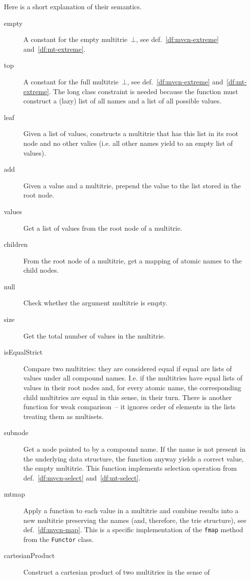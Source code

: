 \documentclass{article}
\theoremstyle{definition}
\begin{document}
Here is a short explanation of their semantics.
\begin{description}
\item [empty]
  A constant for the empty multitrie~$\bot$, see def.~\ref{df:mvcn-extreme}
  and~\ref{df:mt-extreme}.
\item [top]
  A constant for the full multitrie~$\bot$, see def.~\ref{df:mvcn-extreme}
  and~\ref{df:mt-extreme}.  The long class constraint is needed because the
  function must construct a (lazy) list of all names and a list of all possible
  values.
\item [leaf] Given a list of values, constructs a multitrie that has this list
  in its root node and no other valies (i.e. all other names yield to an empty
  list of values).
\item [add]
  Given a value and a multitrie, prepend the value to the list stored in the
  root node.
\item [values]
  Get a list of values from the root node of a multitrie.
\item [children]
  From the root node of a multitrie, get a mapping of atomic names to the
  child nodes.
\item [null]
  Check whether the argument multitrie is empty.
\item [size]
  Get the total number of values in the multitrie.
\item [isEqualStrict]
  Compare two multitries: they are considered equal if equal are lists of
  values under all compound names. I.e. if the multitries have equal lists
  of values in their root nodes and, for every atomic name, the corresponding
  child multitries are equal in this sense, in their turn. There is another
  function for weak comparison~-- it ignores order of elements in the lists
  treating them as multisets.
\item [subnode]
  Get a node pointed to by a compound name. If the name is not present in the
  underlying data structure, the function anyway yields a correct value, the
  empty multitrie. This function implements selection operation from
  def.~\ref{df:mvcn-select} and~\ref{df:mt-select}.
\item [mtmap]
  Apply a function to each value in a multitrie and combine results into
  a new multitrie preserving the names (and, therefore, the trie structure),
  see def.~\ref{df:mvcn-map}.
  This is a specific implementation of the \lstinline{fmap} method from the
  \lstinline{Functor} class.
\item [cartesianProduct]
  Construct a cartesian product of two multitries in the sense of

\end{description}
\end{document}
